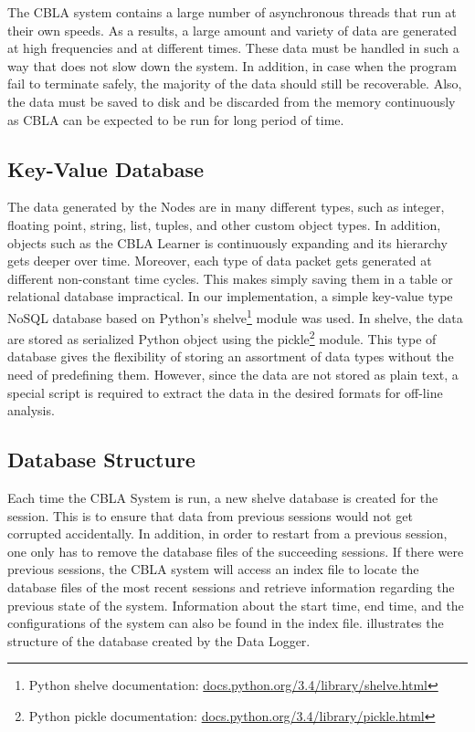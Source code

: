 The CBLA system contains a large number of asynchronous threads that run at their own speeds. As a results, a large amount and variety of data are generated at high frequencies and at different times. These data must be handled in such a way that does not slow down the system. In addition, in case when the program fail to terminate safely, the majority of the data should still be recoverable. Also, the data must be saved to disk and be discarded from the memory continuously as CBLA can be expected to be run for long period of time.

\subsection{Key-Value Database}
 
The data generated by the Nodes are in many different types, such as integer, floating point, string, list, tuples, and other custom object types. In addition, objects such as the CBLA Learner is continuously expanding and its hierarchy gets deeper over time. Moreover, each type of data packet gets generated at different non-constant time cycles. This makes simply saving them in a table or relational database impractical. In our implementation, a simple key-value type NoSQL database based on Python's shelve\footnote{Python shelve documentation: \url{docs.python.org/3.4/library/shelve.html}} module was used. In shelve, the data are stored as serialized Python object using the pickle\footnote{Python pickle documentation: \url{docs.python.org/3.4/library/pickle.html}} module. This type of database gives the flexibility of storing an assortment of data types without the need of predefining them. However, since the data are not stored as plain text, a special script is required to extract the data in the desired formats for off-line analysis. 

\subsection{Database Structure}

Each time the CBLA System is run, a new shelve database is created for the session. This is to ensure that data from previous sessions would not get corrupted accidentally. In addition, in order to restart from a previous session, one only has to remove the database files of the succeeding sessions. If there were previous sessions, the CBLA system will access an index file to locate the database files of the most recent sessions and retrieve information regarding the previous state of the system. Information about the start time, end time, and the configurations of the system can also be found in the index file.  illustrates the structure of the database created by the Data Logger. 

